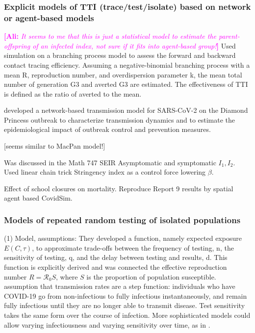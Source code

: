 \documentclass[12pt]{article}
\newcommand{\Rnum}{\mathcal{R}_0}
\newcommand{\covid}{COVID-19\xspace}
\newcommand{\comment}{\showcomment}
\newcommand{\showcomment}[3]{\textcolor{#1}{\textbf{[#2: }\textsl{#3}\textbf{]}}}
\newcommand{\ali}[1]{\comment{magenta}{Ali}{#1}}
\theoremstyle{definition} %
\begin{document}
\subsubsection{Explicit models of TTI (trace/test/isolate) based on network or agent-based models}
\citep{endo2020implication} \ali{It seems to me that this is just a statistical model to estimate the parent-offspring of an infected index, not sure if it fits into agent-based group!} Used simulation on a branching process model to assess the forward and backward contact tracing efficiency. Assuming a negative-binomial branching process with a mean R, reproduction number, and overdispersion parameter k, the mean total number of generation G3 and averted G3 are estimated. The effectiveness of TTI is defined as the ratio of averted to the mean.

\citep{jenness2020modeling} developed a network-based transmission model for SARS-CoV-2 on the Diamond Princess outbreak to characterize transmission dynamics and to estimate the epidemiological impact of outbreak control and prevention measures. 

\citep{elbanna2020entry} [seems similar to MacPan model!]

\citep{de2020influenza} Was discussed in the Math 747 
SEIR Asymptomatic and symptomatic $I_1, I_2$. Used linear chain trick 
Stringency index as a control force lowering $\beta$.

\citep{rice2020effect} Effect of school closures on mortality. Reproduce Report 9 results by spatial agent based CovidSim. 
\subsubsection{Models of repeated random testing of isolated populations}
\cite{bergstrom2020frequency}
(1) Model, assumptions: They developed a function, namely expected exposure $E(C,\tau)$, to approximate trade-offs between the frequency of testing, n, the sensitivity of testing, q, and the delay between
testing and results, d. This function is explicitly derived and was connected the effective reproduction number $R=\Rnum S$, where $S$ is the proportion of population susceptible.
assumption that transmission rates are a step function: individuals who
have \covid go from non-infectious to fully infectious instantaneously,
and remain fully infectious until they are no longer able to transmit disease. Test sensitivity takes the same form over the course of infection.
More sophisticated models could allow varying infectiousness and varying
sensitivity over time, as in 
\citep{larremore2020test}.
\end{document}
